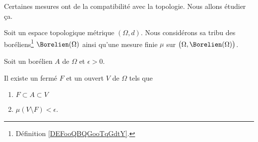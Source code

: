Certaines mesures ont de la compatibilité avec la topologie. Nous allons étudier ça.

\begin{lemma}       \label{LEMooCGKXooYWjRwk}
	Soit un espace topologique métrique \( (\Omega,d)\). Nous considérons sa tribu des boréliens\footnote{Définition \ref{DEFooQBQGooTqGdtY}.} \( \Borelien(\Omega)\) ainsi qu'une mesure finie \( \mu\) sur \( \big(\Omega,\Borelien(\Omega)\big)\).

	Soit un borélien \( A\) de \( \Omega\) et \( \epsilon>0\).

	Il existe un fermé \( F\) et un ouvert \( V\) de \( \Omega\) tels que
	\begin{enumerate}
		\item
		      \( F\subset A\subset V\)
		\item
		      \( \mu(V\setminus F)<\epsilon\).
	\end{enumerate}
\end{lemma}

